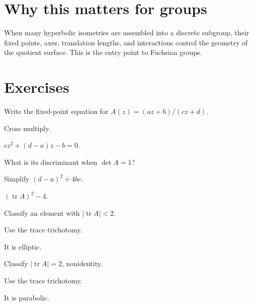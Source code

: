 \section{Why this matters for groups}

When many hyperbolic isometries are assembled into a discrete subgroup, their
fixed points, axes, translation lengths, and interactions control the geometry of
the quotient surface.  This is the entry point to Fuchsian groups.

\section{Exercises}
\begin{exercise}\label{exr:vii34-01}
Write the fixed-point equation for \(A(z)=(az+b)/(cz+d)\).
\end{exercise}
\begin{hint}
Cross multiply.
\end{hint}
\begin{solution}
\(cz^2+(d-a)z-b=0\).
\end{solution}

\begin{exercise}\label{exr:vii34-02}
What is its discriminant when \(\det A=1\)?
\end{exercise}
\begin{hint}
Simplify \((d-a)^2+4bc\).
\end{hint}
\begin{solution}
\((\operatorname{tr}A)^2-4\).
\end{solution}

\begin{exercise}\label{exr:vii34-03}
Classify an element with \(|\operatorname{tr}A|<2\).
\end{exercise}
\begin{hint}
Use the trace trichotomy.
\end{hint}
\begin{solution}
It is elliptic.
\end{solution}

\begin{exercise}\label{exr:vii34-04}
Classify \(|\operatorname{tr}A|=2\), nonidentity.
\end{exercise}
\begin{hint}
Use the trace trichotomy.
\end{hint}
\begin{solution}
It is parabolic.
\end{solution}

